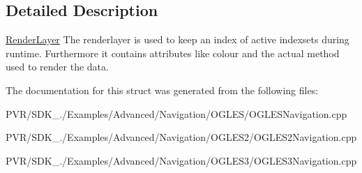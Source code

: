 \subsection{Detailed Description}


  \hyperlink{struct_render_layer}{Render\+Layer}  The renderlayer is used to keep an index of active indexsets during runtime. Furthermore it contains attributes like colour and the actual method used to render the data. 

The documentation for this struct was generated from the following files\+:\begin{DoxyCompactItemize}
\item 
P\+V\+R/\+S\+D\+K\+\_./\+Examples/\+Advanced/\+Navigation/\+O\+G\+L\+E\+S/O\+G\+L\+E\+S\+Navigation.\+cpp\item 
P\+V\+R/\+S\+D\+K\+\_./\+Examples/\+Advanced/\+Navigation/\+O\+G\+L\+E\+S2/O\+G\+L\+E\+S2\+Navigation.\+cpp\item 
P\+V\+R/\+S\+D\+K\+\_./\+Examples/\+Advanced/\+Navigation/\+O\+G\+L\+E\+S3/O\+G\+L\+E\+S3\+Navigation.\+cpp\end{DoxyCompactItemize}
